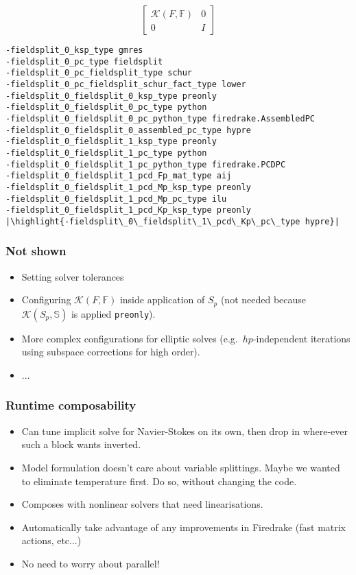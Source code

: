 \documentclass[presentation]{beamer}
\newcommand{\KSP}[2]{\ensuremath{\mathcal{K}\left(#1, \mathbb{#2}\right)}}
\newcommand{\ksp}[1]{\KSP{#1}{#1}}
\newcommand{\highlight}[1]{\colorbox{red!20}{\color{black} #1}}
\begin{document}
\begin{frame}[fragile]
\begin{onlyenv}
\begin{equation*}
{\begin{bmatrix}
        \ksp{F} & 0 \\
        0 & I
      \end{bmatrix}}
    \end{equation*}
\begin{verbatim}
-fieldsplit_0_ksp_type gmres
-fieldsplit_0_pc_type fieldsplit
-fieldsplit_0_pc_fieldsplit_type schur
-fieldsplit_0_pc_fieldsplit_schur_fact_type lower
-fieldsplit_0_fieldsplit_0_ksp_type preonly
-fieldsplit_0_fieldsplit_0_pc_type python
-fieldsplit_0_fieldsplit_0_pc_python_type firedrake.AssembledPC
-fieldsplit_0_fieldsplit_0_assembled_pc_type hypre
-fieldsplit_0_fieldsplit_1_ksp_type preonly
-fieldsplit_0_fieldsplit_1_pc_type python
-fieldsplit_0_fieldsplit_1_pc_python_type firedrake.PCDPC
-fieldsplit_0_fieldsplit_1_pcd_Fp_mat_type aij
-fieldsplit_0_fieldsplit_1_pcd_Mp_ksp_type preonly
-fieldsplit_0_fieldsplit_1_pcd_Mp_pc_type ilu
-fieldsplit_0_fieldsplit_1_pcd_Kp_ksp_type preonly
|\highlight{-fieldsplit\_0\_fieldsplit\_1\_pcd\_Kp\_pc\_type hypre}|
\end{verbatim}
  \end{onlyenv}
\end{frame}

\begin{frame}
  \frametitle{Not shown}
  \begin{itemize}
  \item Setting solver tolerances
  \item Configuring $\ksp{F}$ inside application of $S_p$ (not
    needed because $\KSP{S_p}{S}$ is applied \texttt{preonly}).
  \item More complex configurations for elliptic solves
    (e.g.~$hp$-independent iterations using subspace corrections
    for high order).
  \item ...
  \end{itemize}
\end{frame}

\begin{frame}
  \frametitle{Runtime composability}

  \begin{itemize}
  \item Can tune implicit solve for Navier-Stokes on its own, then
    drop in where-ever such a block wants inverted.

  \item Model formulation doesn't care about variable
    splittings. Maybe we wanted to eliminate temperature first.  Do
    so, without changing the code.

  \item Composes with nonlinear solvers that need linearisations.

  \item Automatically take advantage of any improvements in Firedrake
    (fast matrix actions, etc...)

  \item No need to worry about parallel!
  \end{itemize}
\end{frame}
\end{document}

